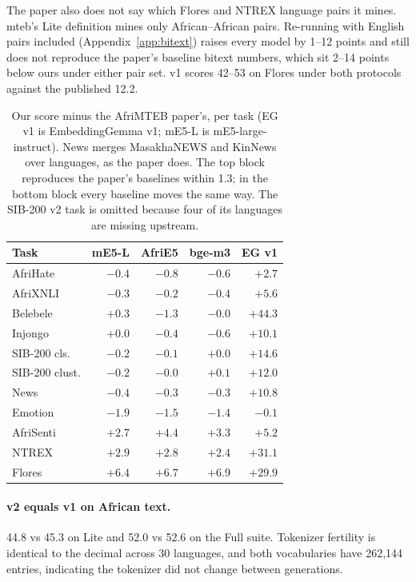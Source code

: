 \documentclass[conference]{IEEEtran}
\newcommand{\eg}{EmbeddingGemma}
\begin{document}
The paper also does not say which Flores and NTREX language pairs it mines.
mteb's Lite definition mines only African--African pairs. Re-running with
English pairs included (Appendix~\ref{app:bitext}) raises every model by 1--12 points and still does not reproduce the paper's baseline bitext numbers, which
sit 2--14 points below ours under either pair set. v1 scores 42--53 on Flores
under both protocols against the published 12.2.

\begin{table}[t]
  \centering
  \caption{Our score minus the AfriMTEB paper's, per task (EG v1 is
  \eg{} v1; mE5-L is mE5-large-instruct). News merges MasakhaNEWS and KinNews over
  languages, as the paper does. The top block reproduces the paper's
  baselines within 1.3; in the bottom block every baseline moves the same way. The SIB-200 v2 task is omitted because four of its
  languages are missing upstream.}
  \label{tab:reconcile}
  \small
  \setlength{\tabcolsep}{4pt}
  \begin{tabular}{lrrrr}
    \toprule
    Task & mE5-L & AfriE5 & bge-m3 & EG v1 \\
    \midrule
    AfriHate       & $-0.4$ & $-0.8$ & $-0.6$ & $+2.7$ \\
    AfriXNLI       & $-0.3$ & $-0.2$ & $-0.4$ & $+5.6$ \\
    Belebele       & $+0.3$ & $-1.3$ & $-0.0$ & $\mathbf{+44.3}$ \\
    Injongo        & $+0.0$ & $-0.4$ & $-0.6$ & $+10.1$ \\
    SIB-200 cls.   & $-0.2$ & $-0.1$ & $+0.0$ & $+14.6$ \\
    SIB-200 clust. & $-0.2$ & $-0.0$ & $+0.1$ & $+12.0$ \\
    News           & $-0.4$ & $-0.3$ & $-0.3$ & $+10.8$ \\
    \midrule
    Emotion        & $-1.9$ & $-1.5$ & $-1.4$ & $-0.1$ \\
    AfriSenti      & $+2.7$ & $+4.4$ & $+3.3$ & $+5.2$ \\
    NTREX          & $+2.9$ & $+2.8$ & $+2.4$ & $\mathbf{+31.1}$ \\
    Flores         & $+6.4$ & $+6.7$ & $+6.9$ & $\mathbf{+29.9}$ \\
    \bottomrule
  \end{tabular}
\end{table}

\paragraph{v2 equals v1 on African text.}
44.8 vs 45.3 on Lite and 52.0 vs 52.6 on the Full suite. Tokenizer fertility
is identical to the decimal across 30 languages, and both vocabularies have 262,144 entries, indicating the tokenizer did not change between generations.
\end{document}
